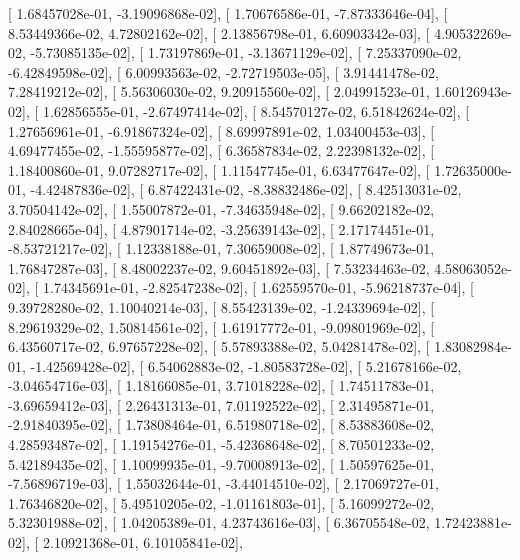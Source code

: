 \documentclass{article}
\begin{document}
       [  1.68457028e-01,  -3.19096868e-02],
       [  1.70676586e-01,  -7.87333646e-04],
       [  8.53449366e-02,   4.72802162e-02],
       [  2.13856798e-01,   6.60903342e-03],
       [  4.90532269e-02,  -5.73085135e-02],
       [  1.73197869e-01,  -3.13671129e-02],
       [  7.25337090e-02,  -6.42849598e-02],
       [  6.00993563e-02,  -2.72719503e-05],
       [  3.91441478e-02,   7.28419212e-02],
       [  5.56306030e-02,   9.20915560e-02],
       [  2.04991523e-01,   1.60126943e-02],
       [  1.62856555e-01,  -2.67497414e-02],
       [  8.54570127e-02,   6.51842624e-02],
       [  1.27656961e-01,  -6.91867324e-02],
       [  8.69997891e-02,   1.03400453e-03],
       [  4.69477455e-02,  -1.55595877e-02],
       [  6.36587834e-02,   2.22398132e-02],
       [  1.18400860e-01,   9.07282717e-02],
       [  1.11547745e-01,   6.63477647e-02],
       [  1.72635000e-01,  -4.42487836e-02],
       [  6.87422431e-02,  -8.38832486e-02],
       [  8.42513031e-02,   3.70504142e-02],
       [  1.55007872e-01,  -7.34635948e-02],
       [  9.66202182e-02,   2.84028665e-04],
       [  4.87901714e-02,  -3.25639143e-02],
       [  2.17174451e-01,  -8.53721217e-02],
       [  1.12338188e-01,   7.30659008e-02],
       [  1.87749673e-01,   1.76847287e-03],
       [  8.48002237e-02,   9.60451892e-03],
       [  7.53234463e-02,   4.58063052e-02],
       [  1.74345691e-01,  -2.82547238e-02],
       [  1.62559570e-01,  -5.96218737e-04],
       [  9.39728280e-02,   1.10040214e-03],
       [  8.55423139e-02,  -1.24339694e-02],
       [  8.29619329e-02,   1.50814561e-02],
       [  1.61917772e-01,  -9.09801969e-02],
       [  6.43560717e-02,   6.97657228e-02],
       [  5.57893388e-02,   5.04281478e-02],
       [  1.83082984e-01,  -1.42569428e-02],
       [  6.54062883e-02,  -1.80583728e-02],
       [  5.21678166e-02,  -3.04654716e-03],
       [  1.18166085e-01,   3.71018228e-02],
       [  1.74511783e-01,  -3.69659412e-03],
       [  2.26431313e-01,   7.01192522e-02],
       [  2.31495871e-01,  -2.91840395e-02],
       [  1.73808464e-01,   6.51980718e-02],
       [  8.53883608e-02,   4.28593487e-02],
       [  1.19154276e-01,  -5.42368648e-02],
       [  8.70501233e-02,   5.42189435e-02],
       [  1.10099935e-01,  -9.70008913e-02],
       [  1.50597625e-01,  -7.56896719e-03],
       [  1.55032644e-01,  -3.44014510e-02],
       [  2.17069727e-01,   1.76346820e-02],
       [  5.49510205e-02,  -1.01161803e-01],
       [  5.16099272e-02,   5.32301988e-02],
       [  1.04205389e-01,   4.23743616e-03],
       [  6.36705548e-02,   1.72423881e-02],
       [  2.10921368e-01,   6.10105841e-02],
\end{document}

